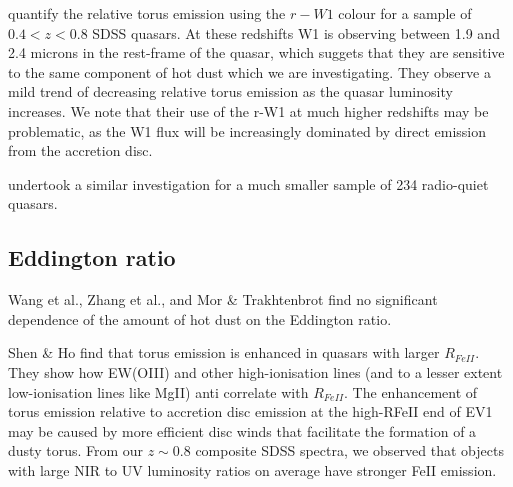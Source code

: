 \citet{shen14} quantify the relative torus emission using the $r-W1$ colour for a sample of $0.4 < z < 0.8$ SDSS quasars. 
At these redshifts W1 is observing between 1.9 and 2.4 microns in the rest-frame of the quasar, which suggets that they are sensitive to the same component of hot dust which we are investigating. 
They observe a mild trend of decreasing relative torus emission as the quasar luminosity increases. 
We note that their use of the r-W1 at much higher redshifts may be problematic, as the W1 flux will be increasingly dominated by direct emission from the accretion disc. 

\citet{gallagher07} undertook a similar investigation for a much smaller sample of 234 radio-quiet quasars.


\subsection{Eddington ratio}

Wang et al., Zhang et al., and Mor \& Trakhtenbrot find no significant dependence of the amount of hot dust on the Eddington ratio. 

Shen \& Ho find that torus emission is enhanced in quasars with larger $R_{FeII}$. 
They show how EW(OIII) and other high-ionisation lines (and to a lesser extent low-ionisation lines like MgII) anti correlate with $R_{FeII}$. 
The enhancement of torus emission relative to accretion disc emission at the high-RFeII end of EV1 may be caused by more efficient disc winds that facilitate the formation of a dusty torus. 
From our $z\sim0.8$ composite SDSS spectra, we observed that objects with large NIR to UV luminosity ratios on average have stronger FeII emission. 

